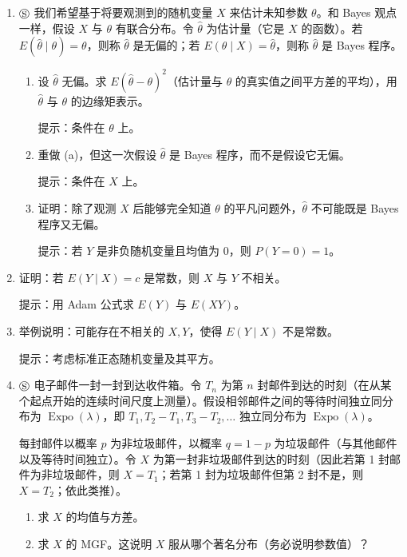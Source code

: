 \documentclass[UTF8,12pt,a4paper,fontset=fandol]{ctexart}
\begin{document}
\begin{enumerate}
  \item $\circledS$ 我们希望基于将要观测到的随机变量 $X$ 来估计未知参数 $\theta$。和 Bayes 观点一样，假设 $X$ 与 $\theta$ 有联合分布。令 $\hat\theta$ 为估计量（它是 $X$ 的函数）。若 $E(\hat\theta\mid \theta)=\theta$，则称 $\hat\theta$ 是无偏的；若 $E(\theta\mid X)=\hat\theta$，则称 $\hat\theta$ 是 Bayes 程序。
  \begin{enumerate}
    \item[(a)] 设 $\hat\theta$ 无偏。求 $E(\hat\theta-\theta)^2$（估计量与 $\theta$ 的真实值之间平方差的平均），用 $\hat\theta$ 与 $\theta$ 的边缘矩表示。

    \noindent 提示：条件在 $\theta$ 上。

    \item[(b)] 重做 (a)，但这一次假设 $\hat\theta$ 是 Bayes 程序，而不是假设它无偏。

    \noindent 提示：条件在 $X$ 上。

    \item[(c)] 证明：除了观测 $X$ 后能够完全知道 $\theta$ 的平凡问题外，$\hat\theta$ 不可能既是 Bayes 程序又无偏。

    \noindent 提示：若 $Y$ 是非负随机变量且均值为 $0$，则 $P(Y=0)=1$。
  \end{enumerate}

  \item 证明：若 $E(Y\mid X)=c$ 是常数，则 $X$ 与 $Y$ 不相关。

  \noindent 提示：用 Adam 公式求 $E(Y)$ 与 $E(XY)$。

  \item 举例说明：可能存在不相关的 $X,Y$，使得 $E(Y\mid X)$ 不是常数。

  \noindent 提示：考虑标准正态随机变量及其平方。

  \item $\circledS$ 电子邮件一封一封到达收件箱。令 $T_n$ 为第 $n$ 封邮件到达的时刻（在从某个起点开始的连续时间尺度上测量）。假设相邻邮件之间的等待时间独立同分布为 $\operatorname{Expo}(\lambda)$，即 $T_1,T_2-T_1,T_3-T_2,\ldots$ 独立同分布为 $\operatorname{Expo}(\lambda)$。

  每封邮件以概率 $p$ 为非垃圾邮件，以概率 $q=1-p$ 为垃圾邮件（与其他邮件以及等待时间独立）。令 $X$ 为第一封非垃圾邮件到达的时刻（因此若第 1 封邮件为非垃圾邮件，则 $X=T_1$；若第 1 封为垃圾邮件但第 2 封不是，则 $X=T_2$；依此类推）。
  \begin{enumerate}
    \item[(a)] 求 $X$ 的均值与方差。
    \item[(b)] 求 $X$ 的 MGF。这说明 $X$ 服从哪个著名分布（务必说明参数值）？
  \end{enumerate}


\end{enumerate}
\end{document}
